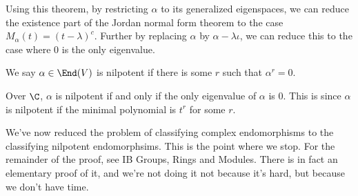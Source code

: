 \documentclass[a4paper]{article}
\begin{document}
Using this theorem, by restricting $\alpha$ to its generalized eigenspaces, we can reduce the existence part of the Jordan normal form theorem to the case $M_\alpha(t) = (t - \lambda)^c$. Further by replacing $\alpha$ by $\alpha - \lambda \iota$, we can reduce this to the case where $0$ is the only eigenvalue.

\begin{defi}[Nilpotent]
  We say $\alpha \in \End(V)$ is nilpotent if there is some $r$ such that $\alpha^r = 0$.
\end{defi}
Over $\C$, $\alpha$ is nilpotent if and only if the only eigenvalue of $\alpha$ is $0$. This is since $\alpha$ is nilpotent if the minimal polynomial is $t^r$ for some $r$.

We've now reduced the problem of classifying complex endomorphisms to the classifying nilpotent endomorphsims. This is the point where we stop. For the remainder of the proof, see IB Groups, Rings and Modules. There is in fact an elementary proof of it, and we're not doing it not because it's hard, but because we don't have time.
\end{document}
